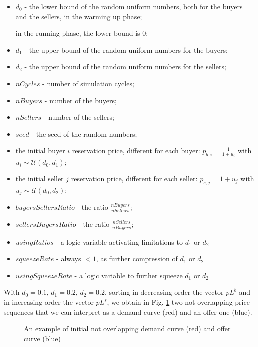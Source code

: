\documentclass[10pt]{report}
\begin{document}
\begin{itemize}
\item $d_0$ - the lower bound of the random uniform numbers, both for the buyers and the sellers, in the warming up phase; 

in the running phase, the lower bound is $0$;
\item $d_1$ - the upper bound of the random uniform numbers for the buyers;
\item $d_2$ - the upper bound of the random uniform numbers for the sellers;
\item $nCycles$ - number of simulation cycles;
\item $nBuyers$  - number of the buyers;
\item $nSellers$ - number of the sellers;
\item $seed$ - the seed of the random numbers;
\item the initial buyer $i$ reservation price, different for each buyer: $p_{b,i}=\frac{1} {1 + u_i}$ with $u_i\sim\mathcal{U}(d_0,d_1)$;
\item the initial seller $j$ reservation price, different for each seller: $p_{s,j}=1 + u_j$ with $u_j\sim\mathcal{U}(d_0,d_2)$;
\item $buyersSellersRatio$ - the ratio $\frac{nBuyers}{nSellers}$;
\item $sellersBuyersRatio$ - the ratio $\frac{nSellers}{nBuyers}$;
\item $usingRatios$ - a logic variable activating limitations to $d_1$ or $d_2$
\item $squeezeRate$ - always $< 1$, as further compression of $d_1$ or $d_2$
\item $usingSqueezeRate$ - a logic variable to further squeeze $d_1$ or $d_2$
\end{itemize}

With  $d_0=0.1$, $d_1=0.2$, $d_2=0.2$, sorting in decreasing order the vector  $pL^b$ and in increasing order the vector  $pL^s$, we obtain in Fig. \ref{output_3_1.png} two not overlapping price sequences that we can interpret as a demand curve (red) and an offer one (blue).

\begin{figure}[H]
\begin{center}
\caption{An example of initial not overlapping demand curve (red) and offer curve (blue)}
\label{output_3_1.png}
\end{center}
\end{figure}
\end{document}
